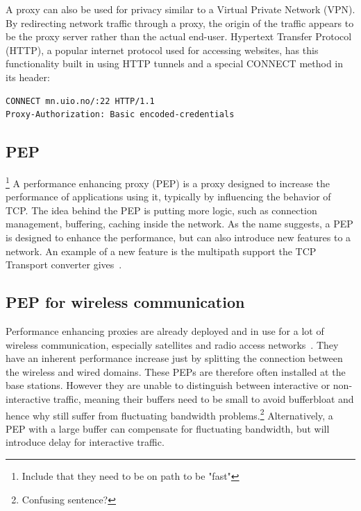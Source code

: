 \documentclass[a4paper,english, 11pt]{report}
\begin{document}
A proxy can also be used for privacy similar to a Virtual Private Network (VPN). By redirecting network traffic through a proxy, the origin of the traffic appears to be the proxy server rather than the actual end-user. Hypertext Transfer Protocol (HTTP), a popular internet protocol used for accessing websites, has this functionality built in using HTTP tunnels and a special CONNECT method in its header:\\

\begin{verbatim}
CONNECT mn.uio.no/:22 HTTP/1.1
Proxy-Authorization: Basic encoded-credentials
\end{verbatim}

\subsection{PEP}\footnote{Include that they need to be on path to be "fast"}
A performance enhancing proxy (PEP) is a proxy designed to increase the performance of applications using it, typically by influencing the behavior of TCP. The idea behind the PEP is putting more logic, such as connection management, buffering, caching inside the network. As the name suggests, a PEP is designed to enhance the performance, but can also introduce new features to a network. An example of a new feature is the multipath support the TCP Transport converter gives~\cite{rfc8803}.

\subsection{PEP for wireless communication}
Performance enhancing proxies are already deployed and in use for a lot of wireless communication, especially satellites and radio access networks~\cite{tcp_mmwave_proxy}. They have an inherent performance increase just by splitting the connection between the wireless and wired domains. These PEPs are therefore often installed at the base stations. However they are unable to distinguish between interactive or non-interactive traffic, meaning their buffers need to be small to avoid bufferbloat and hence why still suffer from fluctuating bandwidth problems.\footnote{Confusing sentence?} Alternatively, a PEP with a large buffer can compensate for fluctuating bandwidth, but will introduce delay for interactive traffic.
\end{document}
